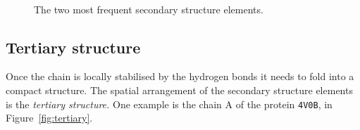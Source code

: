 \begin{figure}[tbp]
	\centering
	\\
	\caption{The two most frequent secondary structure elements.}\label{fig:alpha_beta}
\end{figure}


\subsection{Tertiary structure}
Once the chain is locally stabilised by the hydrogen bonds it needs to fold into a compact structure.
The spatial arrangement of the secondary structure elements is the \emph{tertiary structure.}
One example is the chain A of the protein \texttt{4V0B}, in Figure~\ref{fig:tertiary}.

